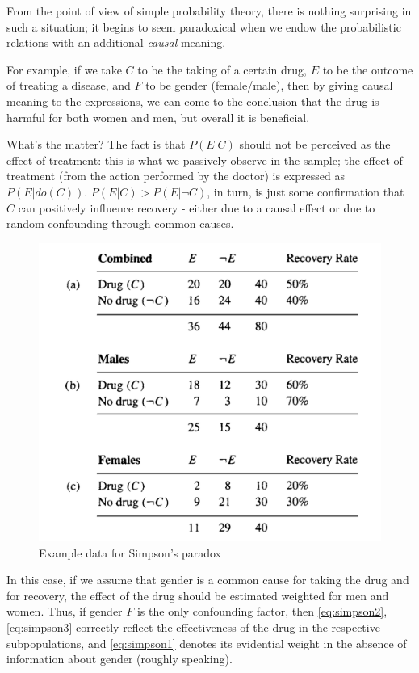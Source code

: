 \documentclass[fleqn]{article}
\numberwithin{equation}{section}
\numberwithin{theorem}{section}
\numberwithin{figure}{section}
\numberwithin{lemma}{section}
\numberwithin{corollary}{section}
\begin{document}
From the point of view of simple probability theory, there is nothing surprising in such a situation; it begins to seem paradoxical when we endow the probabilistic relations with an additional \textit{causal} meaning.

For example, if we take $C$ to be the taking of a certain drug, $E$ to be the outcome of treating a disease, and $F$ to be gender (female/male), then by giving causal meaning to the expressions, we can come to the conclusion that the drug is harmful for both women and men, but overall it is beneficial.

What's the matter? The fact is that $P(E|C)$ should not be perceived as the effect of treatment: this is what we passively observe in the sample; the effect of treatment (from the action performed by the doctor) is expressed as $P(E|do(C))$. $P(E|C) > P(E|\neg C)$, in turn, is just some confirmation that $C$ can positively influence recovery - either due to a causal effect or due to random confounding through common causes.

\begin{figure}[h]
	\begin{center}
		\includegraphics[scale=0.5]{imgs/img28.png}
	\end{center}
	\caption{Example data for Simpson's paradox}
	\label{fig:simpson}
\end{figure}


In this case, if we assume that gender is a common cause for taking the drug and for recovery, the effect of the drug should be estimated weighted for men and women. Thus, if gender $F$ is the only confounding factor, then \ref{eq:simpson2}, \ref{eq:simpson3} correctly reflect the effectiveness of the drug in the respective subpopulations, and \ref{eq:simpson1} denotes its evidential weight in the absence of information about gender (roughly speaking).
\end{document}
